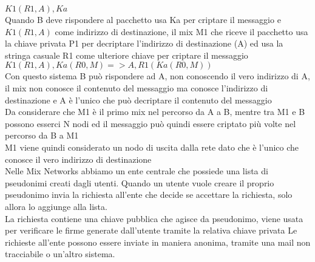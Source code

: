 $K1(R1, A), Ka$ \\
Quando B deve rispondere al pacchetto usa Ka per criptare il messaggio e $K1(R1, A)$ come indirizzo di destinazione, il mix M1 che riceve il pacchetto usa la chiave privata P1 per decriptare l'indirizzo di destinazione (A) ed usa la stringa casuale R1 come ulteriore chiave per criptare il messaggio \\
$K1( R1, A ), Ka( R0, M ) => A, R1( Ka( R0, M ) )$ \\
Con questo sistema B può rispondere ad A, non conoscendo il vero indirizzo di A, il mix non conosce il contenuto del messaggio ma conosce l'indirizzo di destinazione e A è l'unico che può decriptare il contenuto del messaggio \\
Da considerare che M1 è il primo mix nel percorso da A a B, mentre tra M1 e B possono esserci N nodi ed il messaggio può quindi essere criptato più volte nel percorso da B a M1 \\
M1 viene quindi considerato un nodo di uscita dalla rete dato che è l'unico che conosce il vero indirizzo di destinazione \\
Nelle Mix Networks abbiamo un ente centrale che possiede una lista di pseudonimi creati dagli utenti. Quando un utente vuole creare il proprio pseudonimo invia la richiesta all'ente che decide se accettare la richiesta, solo allora lo aggiunge alla lista. \\
La richiesta contiene una chiave pubblica che agisce da pseudonimo, viene usata per verificare le firme generate dall'utente tramite la relativa chiave privata 
Le richieste all'ente possono essere inviate in maniera anonima, tramite una mail non tracciabile o un'altro sistema. \\



\cite{ChaumMixes}